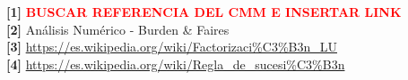 \textbf{[1]} \textcolor{red}{\textbf{BUSCAR REFERENCIA DEL CMM E INSERTAR LINK}} \\

\textbf{[2]} An\'alisis Num\'erico - Burden \& Faires \\

\textbf{[3]} \url{https://es.wikipedia.org/wiki/Factorizaci\%C3\%B3n_LU} \\

\textbf{[4]} \url{https://es.wikipedia.org/wiki/Regla_de_sucesi\%C3\%B3n}